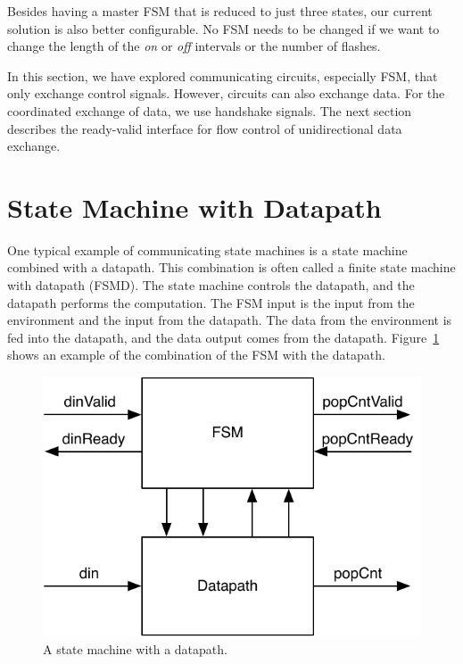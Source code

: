 \documentclass[%
    10pt,
    headinclude, footexclude,
    openright, %
    notitlepage,
    cleardoubleempty,
    headsepline,
    pointlessnumbers,
    bibtotoc, idxtotoc,
    ]{scrbook}
\newcommand{\scale}{0.7}
\begin{document}

Besides having a master FSM that is reduced to just three states, our current solution
is also better configurable. No FSM needs to be changed if we want to change
the length of the \emph{on} or \emph{off} intervals or the number of flashes.

In this section, we have explored communicating circuits, especially FSM, that
only exchange control signals. However, circuits can also exchange data.
For the coordinated exchange of data, we use handshake signals.
The next section describes the ready-valid interface for flow control of
unidirectional data exchange.

\section{State Machine with Datapath}

One typical example of communicating state machines is a state machine
combined with a datapath. This combination is often called a finite state machine
with datapath (FSMD). The state machine controls the datapath, and the datapath
performs the computation. The FSM input is the input from the environment and the input
from the datapath. The data from the environment is fed into the datapath, and the
data output comes from the datapath. Figure~\ref{fig:popcnt-fsmd} shows an example
of the combination of the FSM with the datapath.

\begin{figure}
  \centering
  \includegraphics[scale=\scale]{figures/popcnt-fsmd}
  \caption{A state machine with a datapath.}
  \label{fig:popcnt-fsmd}
\end{figure}
\end{document}
